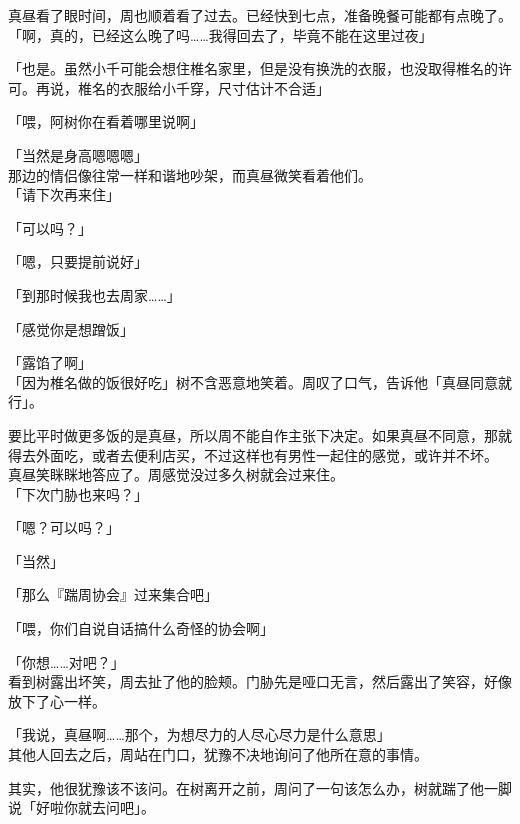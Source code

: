 真昼看了眼时间，周也顺着看了过去。已经快到七点，准备晚餐可能都有点晚了。\\

「啊，真的，已经这么晚了吗……我得回去了，毕竟不能在这里过夜」

「也是。虽然小千可能会想住椎名家里，但是没有换洗的衣服，也没取得椎名的许可。再说，椎名的衣服给小千穿，尺寸估计不合适」

「喂，阿树你在看着哪里说啊」

「当然是身高嗯嗯嗯」\\

那边的情侣像往常一样和谐地吵架，而真昼微笑看着他们。\\

「请下次再来住」

「可以吗？」

「嗯，只要提前说好」

「到那时候我也去周家……」

「感觉你是想蹭饭」

「露馅了啊」\\

「因为椎名做的饭很好吃」树不含恶意地笑着。周叹了口气，告诉他「真昼同意就行」。

要比平时做更多饭的是真昼，所以周不能自作主张下决定。如果真昼不同意，那就得去外面吃，或者去便利店买，不过这样也有男性一起住的感觉，或许并不坏。\\

真昼笑眯眯地答应了。周感觉没过多久树就会过来住。\\

「下次门胁也来吗？」

「嗯？可以吗？」

「当然」

「那么『踹周协会』过来集合吧」

「喂，你们自说自话搞什么奇怪的协会啊」

「你想……对吧？」\\

看到树露出坏笑，周去扯了他的脸颊。门胁先是哑口无言，然后露出了笑容，好像放下了心一样。\\

\vspace{2\baselineskip}

「我说，真昼啊……那个，为想尽力的人尽心尽力是什么意思」\\

其他人回去之后，周站在门口，犹豫不决地询问了他所在意的事情。

其实，他很犹豫该不该问。在树离开之前，周问了一句该怎么办，树就踹了他一脚说「好啦你就去问吧」。

